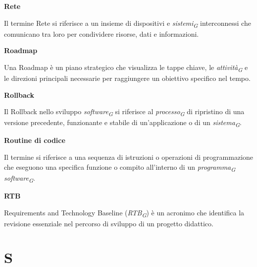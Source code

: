 \documentclass{article}
\begin{document}
\vspace{0.4cm}

\textbf{Rete}

\vspace{0.1cm}

Il termine Rete si riferisce a un insieme di dispositivi e \textit{sistemi}\textsubscript{\textit{G}} interconnessi che comunicano tra loro per condividere risorse, dati e informazioni.

\vspace{0.4cm}

\textbf{Roadmap}

\vspace{0.1cm}

Una Roadmap è un piano strategico che visualizza le tappe chiave, le \textit{attività}\textsubscript{\textit{G}} e le direzioni principali necessarie per raggiungere un obiettivo specifico nel tempo.

\vspace{0.4cm}

\textbf{Rollback}

\vspace{0.1cm}

Il Rollback nello sviluppo \textit{software}\textsubscript{\textit{G}} si riferisce al \textit{processo}\textsubscript{\textit{G}} di ripristino di una versione precedente, funzionante e stabile di un'applicazione o di un \textit{sistema}\textsubscript{\textit{G}}.

\vspace{0.4cm}

\textbf{Routine di codice}

\vspace{0.1cm}

Il termine si riferisce a una sequenza di istruzioni o operazioni di programmazione che eseguono una specifica funzione o compito all'interno di un \textit{programma}\textsubscript{\textit{G}} \textit{software}\textsubscript{\textit{G}}.

\pagebreak

\textbf{RTB}

\vspace{0.1cm}

Requirements and Technology Baseline (\textit{RTB}\textsubscript{\textit{G}}) è un acronimo che identifica la revisione essenziale nel percorso di sviluppo di un progetto didattico.

\pagebreak
\section*{S}
{}
\end{document}
